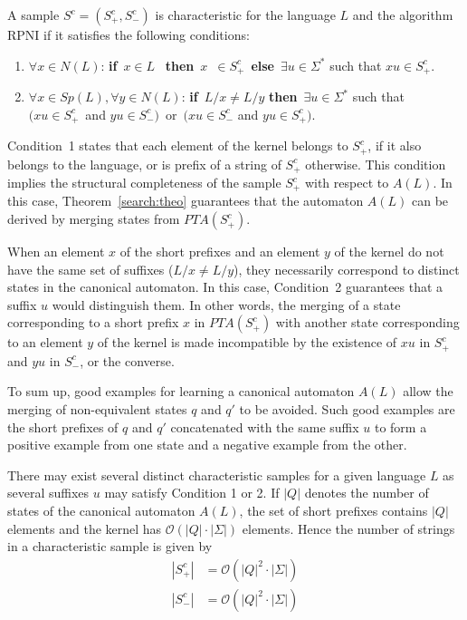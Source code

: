 \begin{definition}
A sample $S^c=(S_{+}^c,S_{-}^c)$ is characteristic for the language $L$ and the algorithm RPNI if it satisfies the following conditions: 
\begin{enumerate}
\item  $\forall x\in N(L)$: \textbf{if}\ $x\in L$ \ \textbf{then}\ $x$\ $\in S_{+}^c$\ \textbf{else}\ $\exists u\in \Sigma ^{*}$ such that $xu\in S_{+}^c$.
\item  $\forall x\in Sp(L),\forall y\in N(L)$: \textbf{if}\ $L/x\neq L/y$ \textbf{then}\ $\exists u\in \Sigma ^{*}$ such that \\$(xu\in S_{+}^c$\ and $yu\in S_{-}^c)$\ or\ $(xu\in S_{-}^c$ and $yu\in S_{+}^c)$.
\end{enumerate}
\label{Characteristic:Sample}
\end{definition}

Condition~1 states that each element of the kernel belongs to $S_{+}^c$, if it also belongs to the language, or is prefix of a string of $S_{+}^c$ otherwise. This condition implies the structural completeness of the sample $S_{+}^c$ with respect to $A(L)$. In this case, Theorem~\ref{search:theo} guarantees that the automaton $A(L)$ can be derived by merging states from $PTA(S_{+}^c)$. 

When an element $x$ of the short prefixes and an element $y$ of the kernel do not have the same set of suffixes ($L/x\neq L/y$), they necessarily correspond to distinct states in the canonical automaton. In this case, Condition~2 guarantees that a suffix $u$ would distinguish them. In other words, the merging of a state corresponding to a short prefix $x$ in $PTA(S_{+}^c)$ with another state corresponding to an element $y$ of the kernel is made incompatible by the existence of $xu$ in $S_{+}^c$ and $yu $ in $S_{-}^c$, or the converse.

To sum up, good examples for learning a canonical automaton $A(L)$ allow the merging of non-equivalent states $q$ and $q'$ to be avoided. Such good examples are the short prefixes of $q$ and $q'$ concatenated with the same suffix $u$ to form a positive example from one state and a negative example from the other. 

There may exist several distinct characteristic samples for a given language $L$ as several suffixes $u$ may satisfy Condition 1 or 2. If $|Q|$ denotes the number of states of the canonical automaton $A(L)$, the set of short prefixes contains $|Q|$ elements and the kernel has $\mathcal{O}(|Q|\cdot |\Sigma |)$ elements. Hence the number of strings in a characteristic sample is given by 
\begin{align*}
|S_{+}^c| &= \mathcal{O}(|Q|^2\cdot |\Sigma |) \\
|S_{-}^c| &= \mathcal{O}(|Q|^2\cdot |\Sigma |)
\end{align*}

